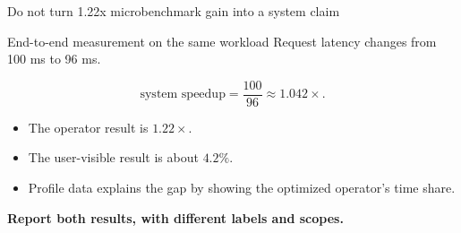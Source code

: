 \documentclass[aspectratio=169,11pt]{beamer}
\newcommand{\term}[1]{\textcolor{HUSTBlue}{\textbf{#1}}}
\begin{document}
\begin{frame}{Do not turn 1.22x microbenchmark gain into a system claim}
  \begin{block}{End-to-end measurement on the same workload}
    Request latency changes from 100 ms to 96 ms.
  \end{block}
  \[
    \text{system speedup}=\frac{100}{96}\approx1.042\times.
  \]
  \begin{itemize}
    \item The operator result is \(1.22\times\).
    \item The user-visible result is about \(4.2\%\).
    \item Profile data explains the gap by showing the optimized operator's time share.
  \end{itemize}
  \term{Report both results, with different labels and scopes.}
\end{frame}
\end{document}
